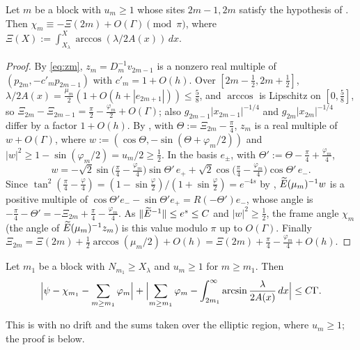 \begin{lemma}\label{lem:C}
Let $m$ be a block with $u_m\ge1$ whose sites $2m-1,2m$ satisfy the hypothesis of
. Then
$\chi_m\equiv-\Xi(2m)+O(\Gamma)\pmod\pi$, where $\Xi(X):=\int_{X_\lambda}^X\arccos(\lambda/2A(x))\,dx$.
\end{lemma}

\begin{proof}
By \eqref{eq:zm}, $z_m=D_m^{-1}v_{2m-1}$ is a nonzero real multiple of
$(p_{2m},-c'_mp_{2m-1})$ with $c'_m=1+O(h)$. Over $[2m-\frac12,2m+\frac12]$,
$\lambda/2A(x)=\frac{\mu_m}2(1+O(h+|e_{2m+1}|))\le\frac58$, and $\arccos$ is Lipschitz on $[0,\frac58]$, so
$\Xi_{2m}-\Xi_{2m-1}=\frac\pi2-\frac{\varphi_m}2+O(\Gamma)$; also $g_{2m-1}|x_{2m-1}|^{-1/4}$ and
$g_{2m}|x_{2m}|^{-1/4}$ differ by a factor $1+O(h)$. By , with
$\Theta:=\Xi_{2m}-\frac\pi4$, $z_m$ is a real multiple of $w+O(\Gamma)$, where
$w:=(\cos\Theta,-\sin(\Theta+\varphi_m/2))$ and $|w|^2\ge1-\sin(\varphi_m/2)=u_m/2\ge\frac12$. In the basis
$e_\pm$, with $\Theta':=\Theta-\frac\pi4+\frac{\varphi_m}4$,
\[
  w=-\sqrt2\sin\bigl(\tfrac\pi4-\tfrac{\varphi_m}4\bigr)\sin\Theta'\,e_++\sqrt2\cos\bigl(\tfrac\pi4-\tfrac{\varphi_m}4\bigr)\cos\Theta'\,e_- .
\]
Since $\tan^2(\frac\pi4-\frac{\varphi}4)=(1-\sin\frac\varphi2)/(1+\sin\frac\varphi2)=e^{-4s}$ by
, $\widetilde E(\mu_m)^{-1}w$ is a positive multiple of
$\cos\Theta'e_--\sin\Theta'e_+=R(-\Theta')e_-$, whose angle is
$-\frac\pi4-\Theta'=-\Xi_{2m}+\frac\pi4-\frac{\varphi_m}4$. As $\|\widetilde E^{-1}\|\le e^{s}\le C$ and $|w|^2\ge\frac12$,
the frame angle $\chi_m$ (the angle of $\widetilde E(\mu_m)^{-1}z_m$) is this value modulo $\pi$ up to
$O(\Gamma)$. Finally $\Xi_{2m}=\Xi(2m)+\frac12\arccos(\mu_m/2)+O(h)=\Xi(2m)+\frac\pi4-\frac{\varphi_m}4+O(h)$.
\end{proof}

\begin{lemma}\label{lem:tail}
Let $m_1$ be a block with $N_{m_1}\ge X_\lambda$ and $u_m\ge1$ for $m\ge m_1$. Then
\[
  \Bigl|\psi-\chi_{m_1}-\sum_{m\ge m_1}\varphi_m\Bigr|+\Bigl|\sum_{m\ge m_1}\varphi_m-\int_{2m_1}^\infty\arcsin\frac\lambda{2A(x)}\,dx\Bigr|
  \le C\Gamma .
\]
\end{lemma}

\noindent This is  with no drift and the sums taken over the elliptic
region, where $u_m\ge1$; the proof is below.


